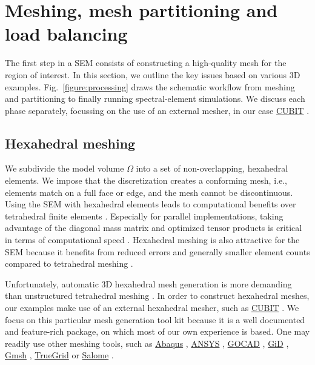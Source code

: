 \documentclass[referee,extra]{gji}
\begin{document}
\section{Meshing, mesh partitioning and load balancing}\label{sec:meshing}

The first step in a SEM consists of constructing a high-quality mesh for the region of interest.
In this section,
we outline the key issues based on various 3D examples.
Fig.~\ref{figure:processing} draws the schematic workflow from meshing and
partitioning to finally running spectral-element simulations.
We discuss each phase separately,
focussing on the use of an external mesher, in our case \href{http://cubit.sandia.gov}{CUBIT}
\citep{Bl94}.

\subsection{Hexahedral meshing}\label{subsec:discretizing}

We subdivide the model volume $\Omega$ into a set of non-overlapping, hexahedral elements.
We impose that the discretization creates a conforming mesh,
i.e., elements match on a full face or edge, and the mesh cannot be discontinuous.
Using the SEM with hexahedral elements leads to computational benefits
over tetrahedral finite elements
\citep{KoMaTrTaWi01,MeViSa06,VoShKi10}.
Especially for parallel implementations,
taking advantage of the diagonal mass matrix and optimized tensor products
is critical in terms of computational speed
\citep{KoTsChTr03,CaKoLaTiMiLeSnTr08,VoShKi10}.
Hexahedral meshing is also attractive for the SEM because it benefits from
reduced errors and generally smaller element counts compared to tetrahedral meshing
\citep{Hest99,KoMaTrTaWi01,VoShKi10}.

Unfortunately,
automatic 3D hexahedral mesh generation is more demanding than unstructured tetrahedral meshing
\citep{ShJo06,StKeOwBlStSh10}.
In order to construct hexahedral meshes, our examples make use of an external hexahedral mesher,
such as \href{http://cubit.sandia.gov}{CUBIT}
\citep{Bl94}.
We focus on this particular mesh generation tool kit because it is a well documented and feature-rich package,
on which most of our own experience is based.
One may readily use other meshing tools,
such as  \href{http://www.simulia.com/products/abaqus_fea.html}{Abaqus} \citep{ABAQUS08},
\href{http://www.ansys.com/}{ANSYS} \citep{ANSYS11},
\href{http://www.gocad.org/www/}{GOCAD} \citep{Ma92,CaCoCaSaVi09},
\href{http://gid.cimne.upc.es}{GiD} \citep{GaGaGo10,Gid11},
\href{http://geuz.org/gmsh}{Gmsh} \citep{GeRe09},
\href{http://www.truegrid.com/}{TrueGrid} \citep{TrueGrid01,NoNu04}
or  \href{http://www.salome-platform.org/}{Salome} \citep{RiCa07,BeLeRo10}.
\end{document}
